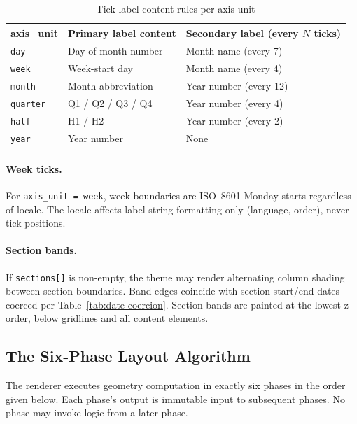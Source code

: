 \begin{table}[h]
\centering
\small
\begin{tabular}{lll}
\toprule
\textbf{axis\_unit} & \textbf{Primary label content} & \textbf{Secondary label (every $N$ ticks)} \\
\midrule
\texttt{day}     & Day-of-month number         & Month name (every 7) \\
\texttt{week}    & Week-start day              & Month name (every 4) \\
\texttt{month}   & Month abbreviation          & Year number (every 12) \\
\texttt{quarter} & Q1 / Q2 / Q3 / Q4           & Year number (every 4) \\
\texttt{half}    & H1 / H2                     & Year number (every 2) \\
\texttt{year}    & Year number                 & None \\
\bottomrule
\end{tabular}
\caption{Tick label content rules per axis unit}
\label{tab:tick-label-density}
\end{table}

\paragraph{Week ticks.}
For \texttt{axis\_unit = week}, week boundaries are ISO~8601 Monday starts regardless of
locale. The locale affects label string formatting only (language, order), never tick positions.

\paragraph{Section bands.}
If \texttt{sections[]} is non-empty, the theme may render alternating column shading between
section boundaries. Band edges coincide with section start/end dates coerced per
Table~\ref{tab:date-coercion}. Section bands are painted at the lowest z-order, below
gridlines and all content elements.

\subsection{The Six-Phase Layout Algorithm}
\label{sec:layout-algorithm}

The renderer executes geometry computation in exactly six phases in the order given below.
Each phase's output is immutable input to subsequent phases. No phase may invoke logic from
a later phase.

